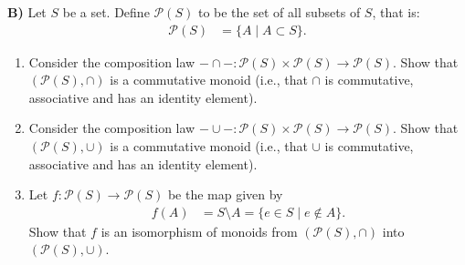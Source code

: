\documentclass[12pt,a4paper]{article}
\begin{document}
\newpage

\noindent\textbf{B)} Let $S$ be a set. Define $\mathcal{P}(S)$ to be the set
of all subsets of $S$, that is:
\begin{align*}
\mathcal{P}(S)&=\{A\mid A\subset S\}.
\end{align*}

\begin{enumerate}
\renewcommand{\labelenumi}{(\arabic{enumi})}

\item Consider the composition law
$-\cap-:\mathcal{P}(S)\times\mathcal{P}(S)\to\mathcal{P}(S)$.
Show that $(\mathcal{P}(S),\cap)$ is a commutative monoid
(i.e., that $\cap$ is commutative, associative and has an identity element).

\item Consider the composition law
$-\cup-:\mathcal{P}(S)\times\mathcal{P}(S)\to\mathcal{P}(S)$.
Show that $(\mathcal{P}(S),\cup)$ is a commutative monoid
(i.e., that $\cup$ is commutative, associative and has an identity element).

\item Let $f:\mathcal{P}(S)\to\mathcal{P}(S)$ be the map given by
\begin{align*}
f(A)&=S\setminus A=\{e\in S\mid e\notin A\}.
\end{align*}
Show that $f$ is an isomorphism of monoids from
$(\mathcal{P}(S),\cap)$ into $(\mathcal{P}(S),\cup)$.

\end{enumerate}
\end{document}
